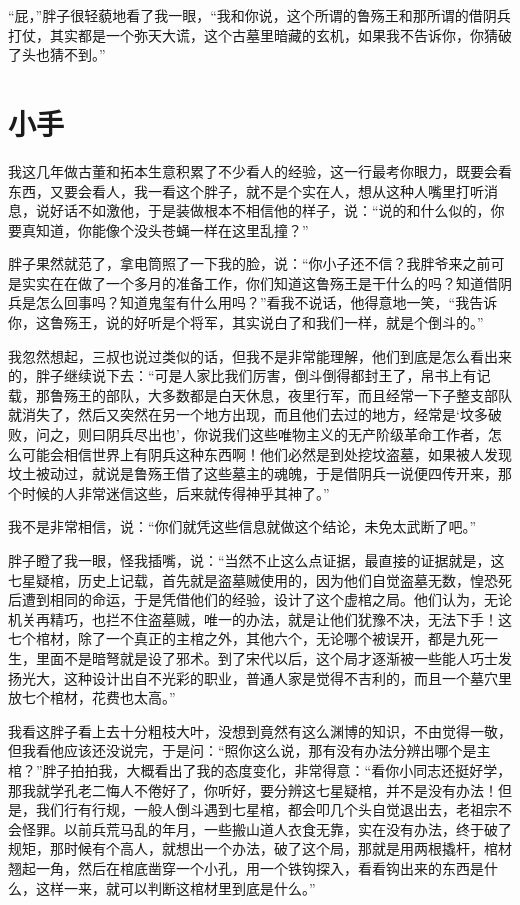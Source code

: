 “屁，”胖子很轻藐地看了我一眼，“我和你说，这个所谓的鲁殇王和那所谓的借阴兵打仗，其实都是一个弥天大谎，这个古墓里暗藏的玄机，如果我不告诉你，你猜破了头也猜不到。”

\chapter{小手}

我这几年做古董和拓本生意积累了不少看人的经验，这一行最考你眼力，既要会看东西，又要会看人，我一看这个胖子，就不是个实在人，想从这种人嘴里打听消息，说好话不如激他，于是装做根本不相信他的样子，说：“说的和什么似的，你要真知道，你能像个没头苍蝇一样在这里乱撞？”

胖子果然就范了，拿电筒照了一下我的脸，说：“你小子还不信？我胖爷来之前可是实实在在做了一个多月的准备工作，你们知道这鲁殇王是干什么的吗？知道借阴兵是怎么回事吗？知道鬼玺有什么用吗？”看我不说话，他得意地一笑，“我告诉你，这鲁殇王，说的好听是个将军，其实说白了和我们一样，就是个倒斗的。”

我忽然想起，三叔也说过类似的话，但我不是非常能理解，他们到底是怎么看出来的，胖子继续说下去：“可是人家比我们厉害，倒斗倒得都封王了，帛书上有记载，那鲁殇王的部队，大多数都是白天休息，夜里行军，而且经常一下子整支部队就消失了，然后又突然在另一个地方出现，而且他们去过的地方，经常是‘坟多破败，问之，则曰阴兵尽出也’，你说我们这些唯物主义的无产阶级革命工作者，怎么可能会相信世界上有阴兵这种东西啊！他们必然是到处挖坟盗墓，如果被人发现坟土被动过，就说是鲁殇王借了这些墓主的魂魄，于是借阴兵一说便四传开来，那个时候的人非常迷信这些，后来就传得神乎其神了。”

我不是非常相信，说：“你们就凭这些信息就做这个结论，未免太武断了吧。”

胖子瞪了我一眼，怪我插嘴，说：“当然不止这么点证据，最直接的证据就是，这七星疑棺，历史上记载，首先就是盗墓贼使用的，因为他们自觉盗墓无数，惶恐死后遭到相同的命运，于是凭借他们的经验，设计了这个虚棺之局。他们认为，无论机关再精巧，也拦不住盗墓贼，唯一的办法，就是让他们犹豫不决，无法下手！这七个棺材，除了一个真正的主棺之外，其他六个，无论哪个被误开，都是九死一生，里面不是暗弩就是设了邪术。到了宋代以后，这个局才逐渐被一些能人巧士发扬光大，这种设计出自不光彩的职业，普通人家是觉得不吉利的，而且一个墓穴里放七个棺材，花费也太高。”

我看这胖子看上去十分粗枝大叶，没想到竟然有这么渊博的知识，不由觉得一敬，但我看他应该还没说完，于是问：“照你这么说，那有没有办法分辨出哪个是主棺？”胖子拍拍我，大概看出了我的态度变化，非常得意：“看你小同志还挺好学，那我就学孔老二悔人不倦好了，你听好，要分辨这七星疑棺，并不是没有办法！但是，我们行有行规，一般人倒斗遇到七星棺，都会叩几个头自觉退出去，老祖宗不会怪罪。以前兵荒马乱的年月，一些搬山道人衣食无靠，实在没有办法，终于破了规矩，那时候有个高人，就想出一个办法，破了这个局，那就是用两根撬杆，棺材翘起一角，然后在棺底凿穿一个小孔，用一个铁钩探入，看看钩出来的东西是什么，这样一来，就可以判断这棺材里到底是什么。”

